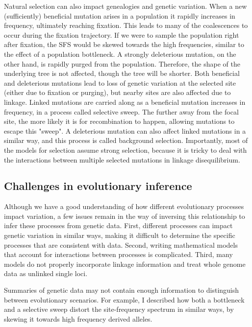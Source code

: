 Natural selection can also impact genealogies and genetic variation.
When a new (sufficiently) beneficial mutation arises in a population it rapidly increases in frequency, ultimately reaching fixation.
This leads to many of the coalescences to occur during the fixation trajectory.
If we were to sample the population right after fixation,
the SFS would be skewed towards the high frequencies, similar to the effect of a population bottleneck.
A strongly deleterious mutation, on the other hand, is rapidly purged from the population.
Therefore, the shape of the underlying tree is not affected, though the tree will be shorter.
Both beneficial and deleterious mutations lead to loss of genetic variation at the selected site (either due to fixation or purging),
but nearby sites are also affected due to linkage.
Linked mutations are carried along as a beneficial mutation increases in frequency, in a process called selective sweep.
The further away from the focal site, the more likely it is for recombination to happen, allowing mutations to escape this "sweep".
A deleterious mutation can also affect linked mutations in a similar way, and this process is called background selection.
Importantly, most of the models for selection assume strong selection,
because it is tricky to deal with the interactions between multiple selected mutations in linkage disequilibrium.

\subsection{Challenges in evolutionary inference}
%
Although we have a good understanding of how different evolutionary processes impact variation,
a few issues remain in the way of inversing this relationship to infer these processes from genetic data.
First, different processes can impact genetic variation in similar ways, making it difficult to determine the specific processes that are consistent with data.
Second, writing mathematical models that account for interactions between processes is complicated.
Third, many models do not properly incorporate linkage information and treat whole genome data as unlinked single loci.

Summaries of genetic data may not contain enough information to distinguish between evolutionary scenarios.
For example, I described how both a bottleneck and a selective sweep distort the site-frequency spectrum in similar ways,
by skewing it towards high frequency derived alleles.

